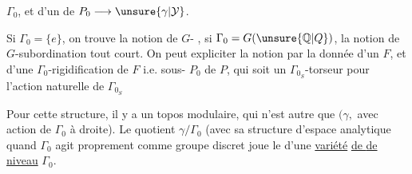  $\Gamma_0$, et d'un  de $P_0\longrightarrow\unsure{\gamma|\mathcal{Y}}$.

Si $\Gamma_0=\{e\}$, on trouve la notion de $G$- , si $\Gamma_0=G(\unsure{\mathbb{Q}|Q})$, la notion de $G$-subordination tout court. On peut expliciter la notion par la donnée d'un $F$, et d'une  $\Gamma_0$-rigidification de $F$ i.e.  sous- $P_0$ de $P$, qui soit un  $\Gamma_{0_S}$-torseur pour l'action naturelle de $\Gamma_{0_S}$\,

Pour cette structure, il y a un topos modulaire, qui n'est autre que  $(\gamma,$ avec action de $\Gamma_0$ à droite).  Le quotient $\gamma/\Gamma_0$ (avec sa structure d'espace analytique quand $\Gamma_0$ agit proprement comme groupe discret\unsure{]|)}  joue le  d'une \uline{variété} \uline{de } \uline{de niveau} $\Gamma_0$.
